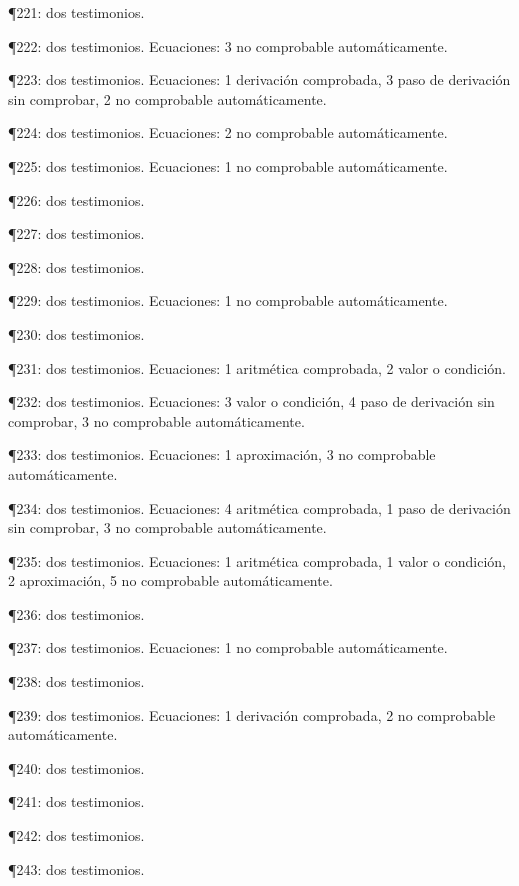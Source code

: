 \documentclass[10pt,openany]{book}
\begin{document}
\noindent ¶221: dos testimonios.\par
\noindent ¶222: dos testimonios. Ecuaciones: 3 no comprobable automáticamente.\par
\noindent ¶223: dos testimonios. Ecuaciones: 1 derivación comprobada, 3 paso de derivación sin comprobar, 2 no comprobable automáticamente.\par
\noindent ¶224: dos testimonios. Ecuaciones: 2 no comprobable automáticamente.\par
\noindent ¶225: dos testimonios. Ecuaciones: 1 no comprobable automáticamente.\par
\noindent ¶226: dos testimonios.\par
\noindent ¶227: dos testimonios.\par
\noindent ¶228: dos testimonios.\par
\noindent ¶229: dos testimonios. Ecuaciones: 1 no comprobable automáticamente.\par
\noindent ¶230: dos testimonios.\par
\noindent ¶231: dos testimonios. Ecuaciones: 1 aritmética comprobada, 2 valor o condición.\par
\noindent ¶232: dos testimonios. Ecuaciones: 3 valor o condición, 4 paso de derivación sin comprobar, 3 no comprobable automáticamente.\par
\noindent ¶233: dos testimonios. Ecuaciones: 1 aproximación, 3 no comprobable automáticamente.\par
\noindent ¶234: dos testimonios. Ecuaciones: 4 aritmética comprobada, 1 paso de derivación sin comprobar, 3 no comprobable automáticamente.\par
\noindent ¶235: dos testimonios. Ecuaciones: 1 aritmética comprobada, 1 valor o condición, 2 aproximación, 5 no comprobable automáticamente.\par
\noindent ¶236: dos testimonios.\par
\noindent ¶237: dos testimonios. Ecuaciones: 1 no comprobable automáticamente.\par
\noindent ¶238: dos testimonios.\par
\noindent ¶239: dos testimonios. Ecuaciones: 1 derivación comprobada, 2 no comprobable automáticamente.\par
\noindent ¶240: dos testimonios.\par
\noindent ¶241: dos testimonios.\par
\noindent ¶242: dos testimonios.\par
\noindent ¶243: dos testimonios.\par
\end{document}
